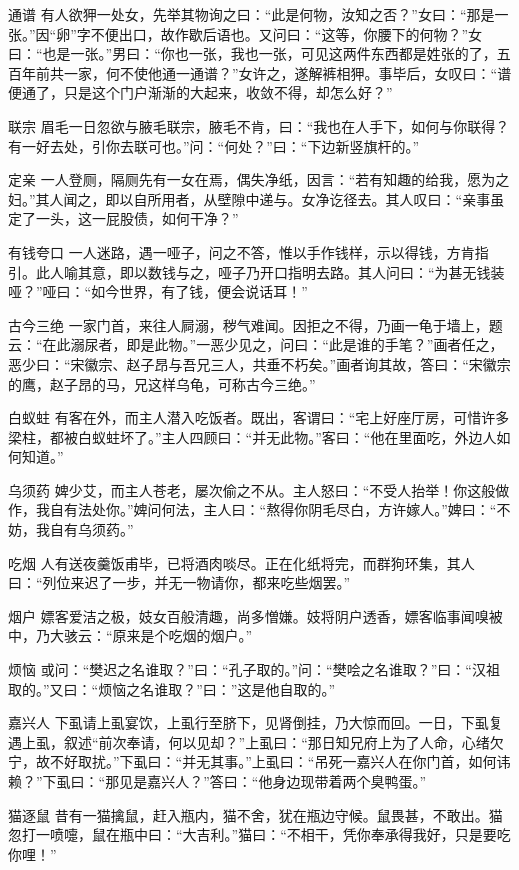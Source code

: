 \documentclass[12pt,UTF8]{ctexbook}
\begin{document}
通谱
有人欲狎一处女，先举其物询之曰：“此是何物，汝知之否？”女曰：“那是一张。”因“卵”字不便出口，故作歇后语也。又问曰：“这等，你腰下的何物？”女曰：“也是一张。”男曰：“你也一张，我也一张，可见这两件东西都是姓张的了，五百年前共一家，何不使他通一通谱？”女许之，遂解裤相狎。事毕后，女叹曰：“谱便通了，只是这个门户渐渐的大起来，收敛不得，却怎么好？”

联宗
眉毛一日忽欲与腋毛联宗，腋毛不肯，曰：“我也在人手下，如何与你联得？有一好去处，引你去联可也。”问：“何处？”曰：“下边新竖旗杆的。”

定亲
一人登厕，隔厕先有一女在焉，偶失净纸，因言：“若有知趣的给我，愿为之妇。”其人闻之，即以自所用者，从壁隙中递与。女净讫径去。其人叹曰：“亲事虽定了一头，这一屁股债，如何干净？”

有钱夸口
一人迷路，遇一哑子，问之不答，惟以手作钱样，示以得钱，方肯指引。此人喻其意，即以数钱与之，哑子乃开口指明去路。其人问曰：“为甚无钱装哑？”哑曰：“如今世界，有了钱，便会说话耳！”

古今三绝
一家门首，来往人屙溺，秽气难闻。因拒之不得，乃画一龟于墙上，题云：“在此溺尿者，即是此物。”一恶少见之，问曰：“此是谁的手笔？”画者任之，恶少曰：“宋徽宗、赵子昂与吾兄三人，共垂不朽矣。”画者询其故，答曰：“宋徽宗的鹰，赵子昂的马，兄这样乌龟，可称古今三绝。”

白蚁蛀
有客在外，而主人潜入吃饭者。既出，客谓曰：“宅上好座厅房，可惜许多梁柱，都被白蚁蛀坏了。”主人四顾曰：“并无此物。”客曰：“他在里面吃，外边人如何知道。”

乌须药
婢少艾，而主人苍老，屡次偷之不从。主人怒曰：“不受人抬举！你这般做作，我自有法处你。”婢问何法，主人曰：“熬得你阴毛尽白，方许嫁人。”婢曰：“不妨，我自有乌须药。”

吃烟
人有送夜羹饭甫毕，已将酒肉啖尽。正在化纸将完，而群狗环集，其人曰：“列位来迟了一步，并无一物请你，都来吃些烟罢。”

烟户
嫖客爱洁之极，妓女百般清趣，尚多憎嫌。妓将阴户透香，嫖客临事闻嗅被中，乃大骇云：“原来是个吃烟的烟户。”

烦恼
或问：“樊迟之名谁取？”曰：“孔子取的。”问：“樊哙之名谁取？”曰：“汉祖取的。”又曰：“烦恼之名谁取？”曰：”这是他自取的。”

嘉兴人
下虱请上虱宴饮，上虱行至脐下，见肾倒挂，乃大惊而回。一日，下虱复遇上虱，叙述“前次奉请，何以见却？”上虱曰：“那日知兄府上为了人命，心绪欠宁，故不好取扰。”下虱曰：“并无其事。”上虱曰：“吊死一嘉兴人在你门首，如何讳赖？”下虱曰：“那见是嘉兴人？”答曰：“他身边现带着两个臭鸭蛋。”

猫逐鼠
昔有一猫擒鼠，赶入瓶内，猫不舍，犹在瓶边守候。鼠畏甚，不敢出。猫忽打一喷嚏，鼠在瓶中曰：“大吉利。”猫曰：“不相干，凭你奉承得我好，只是要吃你哩！”
\end{document}

